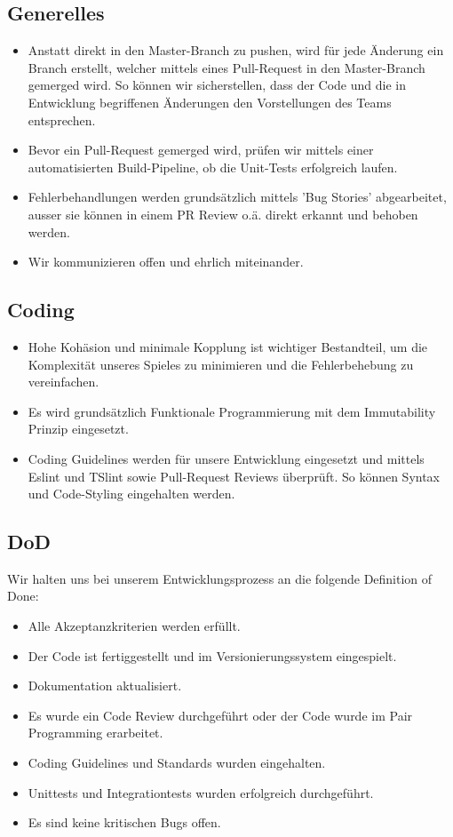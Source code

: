 \documentclass[11pt,a4paper,german]{scrartcl}
\begin{document}
\subsection{Generelles}
\begin{itemize}
  \item Anstatt direkt in den Master-Branch zu pushen, wird für jede Änderung ein Branch erstellt, welcher mittels eines Pull-Request in den Master-Branch gemerged wird.
        So können wir sicherstellen, dass der Code und die in Entwicklung begriffenen Änderungen den Vorstellungen des Teams entsprechen.
  \item Bevor ein Pull-Request gemerged wird, prüfen wir mittels einer automatisierten Build-Pipeline, ob die Unit-Tests erfolgreich laufen.
  \item Fehlerbehandlungen werden grundsätzlich mittels 'Bug Stories' abgearbeitet, ausser sie können in einem PR Review o.ä. direkt erkannt und behoben werden.
  \item Wir kommunizieren offen und ehrlich miteinander.
\end{itemize}

\subsection{Coding}
\begin{itemize}
  \item Hohe Kohäsion und minimale Kopplung ist wichtiger Bestandteil, um die Komplexität unseres Spieles zu minimieren und die Fehlerbehebung zu vereinfachen.
  \item Es wird grundsätzlich Funktionale Programmierung mit dem Immutability Prinzip eingesetzt.
  \item Coding Guidelines werden für unsere Entwicklung eingesetzt und mittels Eslint und TSlint sowie Pull-Request Reviews überprüft. So können Syntax und Code-Styling eingehalten werden.
\end{itemize}

\subsection{DoD}
Wir halten uns bei unserem Entwicklungsprozess an die folgende Definition of Done:
\begin{itemize}
  \item Alle Akzeptanzkriterien werden erfüllt.
  \item Der Code ist fertiggestellt und im Versionierungssystem eingespielt.
  \item Dokumentation aktualisiert.
  \item Es wurde ein Code Review durchgeführt oder der Code wurde im Pair Programming erarbeitet.
  \item Coding Guidelines und Standards wurden eingehalten.
  \item Unittests und Integrationtests wurden erfolgreich durchgeführt.
  \item Es sind keine kritischen Bugs offen.
\end{itemize}
\end{document}
